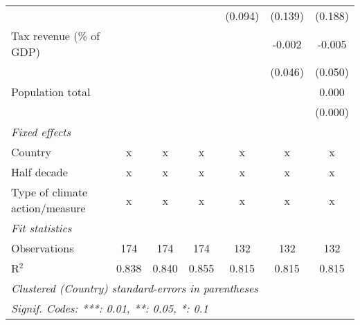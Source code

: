 \begin{tabular}{lcccccc}
                                                          &         &         &                & (0.094)        & (0.139)        & (0.188)\\   
   Tax revenue (\% of GDP)                                &         &         &                &                & -0.002         & -0.005\\   
                                                          &         &         &                &                & (0.046)        & (0.050)\\   
   Population total                                       &         &         &                &                &                & 0.000\\   
                                                          &         &         &                &                &                & (0.000)\\   
   \emph{Fixed effects}\\
   Country                                                & x       & x       & x              & x              & x              & x\\  
   Half decade                                            & x       & x       & x              & x              & x              & x\\  
   Type of climate action/measure                         & x       & x       & x              & x              & x              & x\\  
   \midrule \emph{Fit statistics}\\
   Observations                                           & 174     & 174     & 174            & 132            & 132            & 132\\  
   R$^2$                                                  & 0.838   & 0.840   & 0.855          & 0.815          & 0.815          & 0.815\\  
   \midrule
   \multicolumn{7}{l}{\emph{Clustered (Country) standard-errors in parentheses}}\\
   \multicolumn{7}{l}{\emph{Signif. Codes: ***: 0.01, **: 0.05, *: 0.1}}\\
\end{tabular}
\par\endgroup


